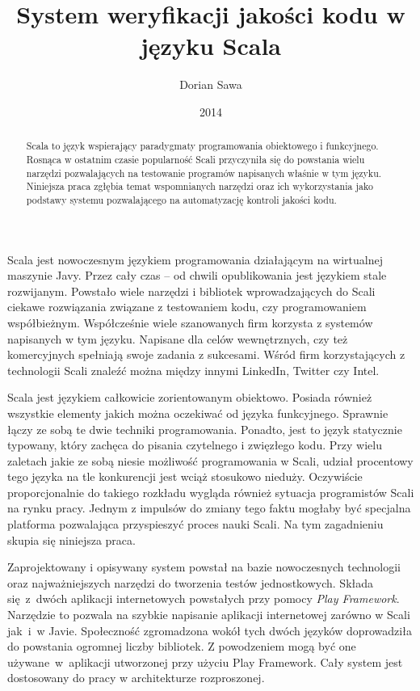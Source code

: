 \documentclass[wimgr]{xmgr}
\author   {Dorian Sawa}
\title    {System weryfikacji jakości kodu \newline w języku Scala}
\date     {2014}
\begin{document}
\begin{abstract}
Scala to język wspierający paradygmaty programowania obiektowego i funkcyjnego. Rosnąca w ostatnim czasie popularność Scali przyczyniła się do powstania wielu narzędzi pozwalających na testowanie programów napisanych właśnie w tym języku. Niniejsza praca zgłębia temat wspomnianych narzędzi oraz ich wykorzystania jako podstawy systemu pozwalającego na automatyzację kontroli jakości kodu.
\end{abstract}

\maketitle
%
\introduction Scala jest nowoczesnym językiem programowania działającym na wirtualnej maszynie Javy. Przez cały czas -- od chwili opublikowania jest językiem stale rozwijanym. Powstało wiele narzędzi i bibliotek wprowadzających do Scali ciekawe rozwiązania związane z testowaniem kodu, czy programowaniem współbieżnym. Współcześnie wiele szanowanych firm korzysta z systemów napisanych w tym języku. Napisane dla celów wewnętrznych, czy też komercyjnych spełniają swoje zadania z sukcesami. Wśród firm korzystających z technologii Scali znaleźć można między innymi LinkedIn, Twitter czy Intel. 

Scala jest językiem całkowicie zorientowanym obiektowo. Posiada również wszystkie elementy jakich można oczekiwać od języka funkcyjnego. Sprawnie łączy ze sobą te dwie techniki programowania. Ponadto, jest to język statycznie typowany, który zachęca do pisania czytelnego i zwięzłego kodu. Przy wielu zaletach jakie ze sobą niesie możliwość programowania w Scali, udział procentowy tego języka na tle konkurencji jest wciąż stosukowo nieduży. Oczywiście proporcjonalnie do takiego rozkładu wygląda również sytuacja programistów Scali na rynku pracy. Jednym z impulsów do zmiany tego faktu mogłaby być specjalna platforma pozwalająca przyspieszyć proces nauki Scali. Na tym zagadnieniu skupia się niniejsza praca.

Zaprojektowany i opisywany system powstał na bazie nowoczesnych technologii oraz najważniejszych narzędzi do tworzenia testów jednostkowych. Składa się~z~dwóch aplikacji internetowych powstałych przy pomocy \emph{Play Framework}. Narzędzie to pozwala na szybkie napisanie aplikacji internetowej zarówno w Scali jak~i~w Javie. Społeczność zgromadzona wokół tych dwóch języków doprowadziła do powstania ogromnej liczby bibliotek. Z powodzeniem mogą być one używane~w~aplikacji utworzonej przy użyciu Play Framework. Cały system jest dostosowany do pracy w architekturze rozproszonej. 
\end{document}
